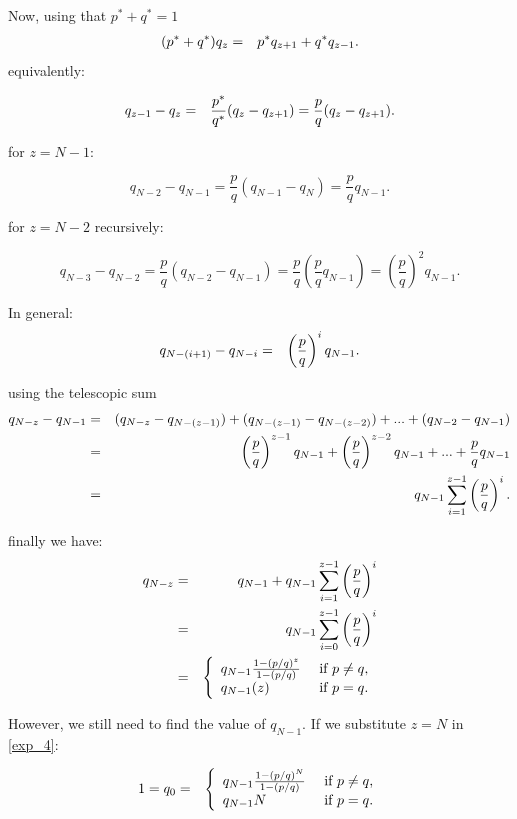 \documentclass[11pt,twoside]{article}
\numberwithin{Theorem}{section}
\numberwithin{Definition}{section}
\numberwithin{Lemma}{section}
\numberwithin{Algorithm}{section}
\numberwithin{equation}{section}
\begin{document}
Now, using that $p^{*} + q^{*} = 1$
\begin{eqnarray}
(p^{*} + q^{*})q_{z} &=&  p^{*}  q_{z+1}+ q^{*} q_{z-1}. \notag 
\end{eqnarray}
equivalently:

\begin{eqnarray}
q_{z-1}- q_{z} &=&  \frac{p^{*}}{q^{*}}(q_{z}- q_{z+1}) = \frac{p}{q}(q_{z}- q_{z+1}). \notag
\end{eqnarray}

for $z = N-1$:

$$q_{N-2} - q_{N-1} = \frac{p}{q}(q_{N-1} - q_{N}) = \frac{p}{q}q_{N-1}.$$

for $z = N-2$ recursively: 

$$q_{N-3} - q_{N-2} = \frac{p}{q}(q_{N-2} - q_{N-1}) = \frac{p}{q}\left(\frac{p}{q}q_{N-1} \right)= \left(\frac{p}{q}\right) ^{2}q_{N-1}.$$

In general:
\begin{eqnarray}
q_{N-(i+1)}- q_{N-i} &=& \left(\frac{p}{q}\right) ^{i} q_{N-1}. \notag
\end{eqnarray}

using the telescopic sum
\begin{eqnarray}
q_{N-z}- q_{N-1} &=&(q_{N-z}- q_{N-(z-1)}) + (q_{N-(z-1)}- q_{N-(z-2)}) + ... + (q_{N-2}- q_{N-1})\notag\\
&=& \left(\frac{p}{q}\right) ^{z-1} q_{N-1} + \left(\frac{p}{q}\right) ^{z-2} q_{N-1} +...+\frac{p}{q}q_{N-1}\notag\\
&=& q_{N-1} \sum_{i =1}^{z-1}\left(\frac{p}{q}\right) ^{i}. \notag
\end{eqnarray}

finally we have:
\begin{eqnarray}
q_{N-z}&=& q_{N-1} + q_{N-1} \sum_{i =1}^{z-1}\left(\frac{p}{q}\right) ^{i}\notag\\
&=& q_{N-1} \sum_{i =0}^{z-1}\left(\frac{p}{q}\right) ^{i} \notag\\
&=& \left\{
\begin{array}{ll}
q_{N-1}\frac{1-(p/q)^{z}}{1-(p/q)} & \text{ if } p\neq q,\\
q_{N-1}(z)& \text{ if } p= q. \label{exp_4}
\end{array}
\right.
\end{eqnarray}

However, we still need to find the value of $q_{N-1}$. If we substitute $z= N$ in \ref{exp_4}:

\begin{eqnarray}
1 = q_{0}&=& \left\{
\begin{array}{ll}
q_{N-1}\frac{1-(p/q)^{N}}{1-(p/q)} & \text{ if } p\neq q,\\
q_{N-1} N& \text{ if } p= q. \notag
\end{array}
\right.
\end{eqnarray}
\end{document}
